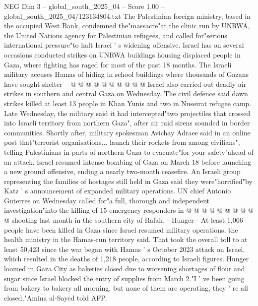 \begin{textsample}{NEG Dim 3 – global\_south\_2025\_04 – Score 1.00 – global\_south\_2025\_04/123134804.txt}
The Palestinian foreign ministry, based in the occupied West Bank, condemned the"massacre"at the clinic run by UNRWA, the United Nations agency for Palestinian refugees, and called for"serious international pressure"to halt Israel ' s widening offensive.
Israel has on several occasions conducted strikes on UNRWA buildings housing displaced people in Gaza, where fighting has raged for most of the past 18 months.
The Israeli military accuses Hamas of hiding in school buildings where thousands of Gazans have sought shelter -- @ @ @ @ @ @ @ @ @ @ Israel also carried out deadly air strikes in southern and central Gaza on Wednesday.
The civil defence said dawn strikes killed at least 13 people in Khan Yunis and two in Nuseirat refugee camp.
Late Wednesday, the military said it had intercepted"two projectiles that crossed into Israeli territory from northern Gaza", after air raid sirens sounded in border communities.
Shortly after, military spokesman Avichay Adraee said in an online post that"terrorist organisations... launch their rockets from among civilians", telling Palestinians in parts of northern Gaza to evacuate"for your safety"ahead of an attack.
Israel resumed intense bombing of Gaza on March 18 before launching a new ground offensive, ending a nearly two-month ceasefire.
An Israeli group representing the families of hostages still held in Gaza said they were"horrified"by Katz ' s announcement of expanded military operations.
UN chief Antonio Guterres on Wednesday called for"a full, thorough and independent investigation"into the killing of 15 emergency responders in @ @ @ @ @ @ @ @ @ @ shooting last month in the southern city of Rafah. - Hunger - At least 1,066 people have been killed in Gaza since Israel resumed military operations, the health ministry in the Hamas-run territory said.
That took the overall toll to at least 50,423 since the war began with Hamas ' s October 2023 attack on Israel, which resulted in the deaths of 1,218 people, according to Israeli figures.
Hunger loomed in Gaza City as bakeries closed due to worsening shortages of flour and sugar since Israel blocked the entry of supplies from March 2."I ' ve been going from bakery to bakery all morning, but none of them are operating, they ' re all closed,"Amina al-Sayed told AFP.

\end{textsample}
